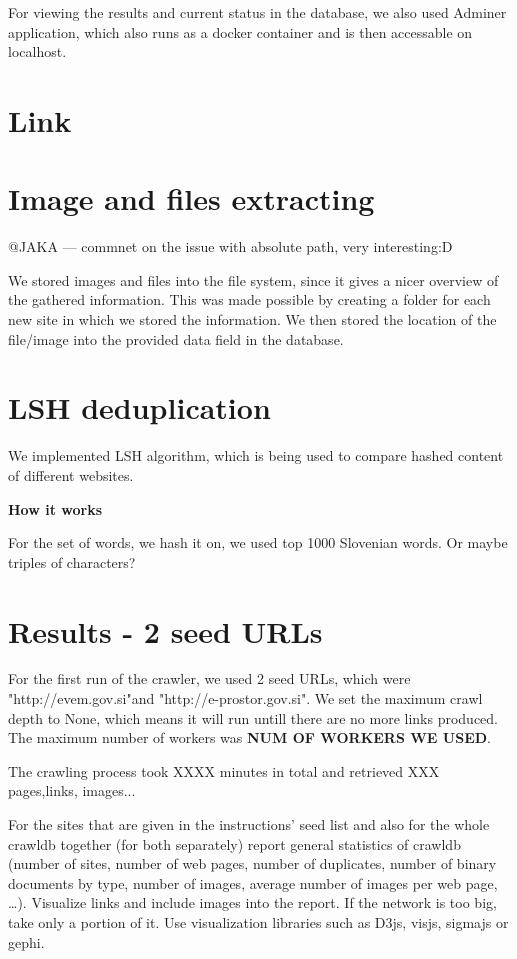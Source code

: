 \documentclass[9pt]{IEEEtran}
\begin{document}
For viewing the results and current status in the database, we also used Adminer application, which also runs as a docker container and is then accessable on localhost.


\section{Link}


\section{Image and files extracting}
@JAKA --- commnet on the issue with absolute path, very interesting:D

We stored images and files into the file system, since it gives a nicer overview of the gathered information. This was made possible by creating a folder for each new site in which we stored the information. We then stored the location of the file/image into the provided data field in the database.




\section{LSH deduplication}
We implemented LSH algorithm, which is being used to compare hashed content of different websites. 

\textbf{How it works}

For the set of words, we hash it on, we used top 1000 Slovenian words. Or maybe triples of characters?


\section{Results - 2 seed URLs}
For the first run of the crawler, we used 2 seed URLs, which were "http://evem.gov.si"and "http://e-prostor.gov.si". We set the maximum crawl depth to None, which means it will run untill there are no more links produced. The maximum number of workers was \textbf{NUM OF WORKERS WE USED}.

The crawling process took XXXX minutes in total and retrieved XXX pages,links, images...

For the sites that are given in the instructions’ seed list and also for the whole crawldb together (for both separately) report general statistics of crawldb (number of sites, number of web pages, number of duplicates, number of binary documents by type, number of images, average number of images per web page, …). Visualize links and include images into the report. If the network is too big, take only a portion of it. Use visualization libraries such as D3js, visjs, sigmajs or gephi.
\end{document}
